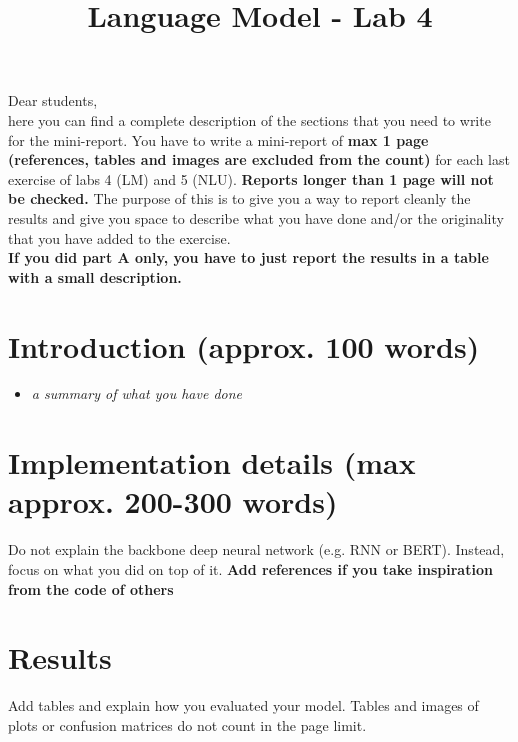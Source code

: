 \documentclass[a4paper]{article}
\title{Language Model - Lab 4}
\begin{document}
\maketitle

Dear students, \\
here you can find a complete description of the sections that you need to write for the mini-report. You have to write a mini-report of \textbf{max 1 page (references, tables and images are excluded from the count)} for each last exercise of labs 4 (LM) and 5 (NLU). \textbf{Reports longer than 1 page will not be checked.} The purpose of this is to give you a way to report cleanly the results and give you space to describe what you have done and/or the originality that you have added to the exercise.
\\
\textbf{If you did part A only, you have to just report the results in a table with a small description.}

\section{Introduction (approx. 100 words)}
\begin{itemize}
    \item \textit{a summary of what you have done}
\end{itemize}
\section{Implementation details (max approx. 200-300 words)}
Do not explain the backbone deep neural network (e.g. RNN or BERT). Instead, focus on what you did on top of it. \textbf{Add references if you take inspiration from the code of others}

\section{Results}
Add tables and explain how you evaluated your model. Tables and images of plots or confusion matrices do not count in the page limit.





\cite{Rabiner89-ATO}
\end{document}
